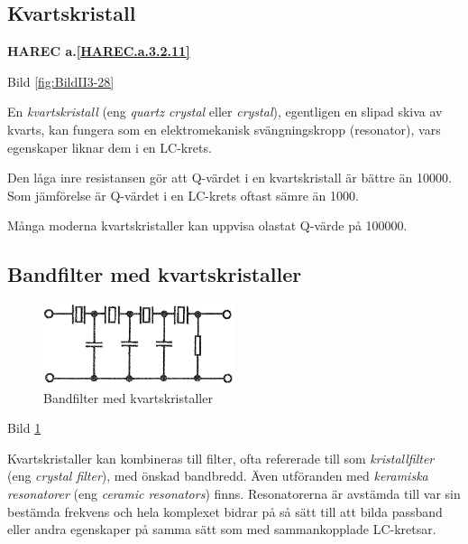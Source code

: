 \subsection{Kvartskristall}

\textbf{HAREC a.\ref{HAREC.a.3.2.11}\label{myHAREC.a.3.2.11}}

Bild \ref{fig:BildII3-28}

En \emph{kvartskristall} (eng \emph{quartz crystal} eller \emph{crystal}),
egentligen en slipad skiva av kvarts, kan fungera som en
elektromekanisk svängningskropp (resonator), vars egenskaper liknar dem i en
LC-krets.

Den låga inre resistansen gör att Q-värdet i en kvartskristall är bättre än
10000. Som jämförelse är Q-värdet i en LC-krets oftast sämre än 1000.

Många moderna kvartskristaller kan uppvisa olastat Q-värde på 100000.

\vspace{12pt} %

\subsection{Bandfilter med kvartskristaller}

\begin{figure}
\includegraphics[width=0.5\textwidth]{images/bild_2_3-29.png}
\caption{Bandfilter med kvartskristaller}
\label{fig:BildII3-29}
\end{figure}

Bild \ref{fig:BildII3-29}

Kvartskristaller kan kombineras till filter, ofta refererade till som
\emph{kristallfilter} (eng \emph{crystal filter}), med önskad bandbredd. Även
utföranden med \emph{keramiska resonatorer} (eng \emph{ceramic resonators})
finns. Resonatorerna är avstämda till var sin bestämda frekvens och hela
komplexet bidrar på så sätt till att bilda passband eller andra egenskaper på
samma sätt som med sammankopplade LC-kretsar.

